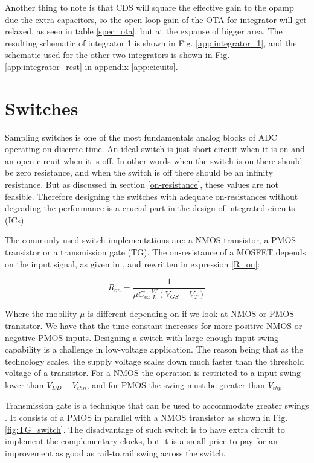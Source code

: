 Another thing to note is that CDS will square the effective gain to the opamp due the extra capacitors, so the open-loop gain of the OTA for integrator will get relaxed, as seen in table \ref{spec_ota}, but at the expanse of bigger area. The resulting schematic of integrator 1 is shown in Fig. \ref{app:integrator_1}, and the schematic used for the other two integrators is shown in Fig. \ref{app:integrator_rest} in appendix \ref{app:cicuits}. 


\section{Switches}
Sampling switches is one of the most fundamentals analog blocks of ADC operating on discrete-time. An ideal switch is just short circuit when it is on and an open circuit when it is off. In other words when the switch is on there should be zero resistance, and when the switch is off there should be an infinity resistance. But as discussed in section \ref{on-resistance}, these values are not feasible. Therefore designing the switches with adequate on-resistances without degrading the performance is a crucial part in the design of integrated circuits (ICs). 

The commonly used switch implementations are: a NMOS transistor, a PMOS transistor or a transmission gate (TG). The on-resistance of a MOSFET depends on the input signal, as given in \cite{Allen}, and rewritten in expression \ref{R_on}:

\begin{equation}\label{R_on}
    R_{on} = \frac{1}{\mu C_{ox}\frac{W}{L}(V_{GS} - V_T)}
\end{equation}

Where the mobility $\mu$ is different depending on if we look at NMOS or PMOS transistor. We have that the time-constant increases for more positive NMOS or negative PMOS inputs. Designing a switch with large enough input swing capability is a challenge in low-voltage application. The reason being that as the technology scales, the supply voltage scales down much faster than the threshold voltage of a transistor. For a NMOS the operation is restricted to a input swing lower than $V_{DD} - V_{thn}$, and for PMOS the swing must be greater than $V_{thp}$. 

Transmission gate is a technique that can be used to accommodate greater swings \cite{Barker}. It consists of a PMOS in parallel with a NMOS transistor as shown in Fig. \ref{fig:TG_switch}. The disadvantage of such switch is to have extra circuit to implement the complementary clocks, but it is a small price to pay for an improvement as good as rail-to.rail swing across the switch.     

